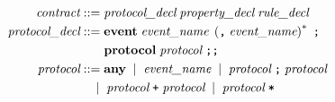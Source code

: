 \documentclass[preview=true]{standalone}
\begin{document}
\begin{table}[t]
\newcommand{\token}[1]{\textbf{#1}}
\newcommand\metasym[1]{{\color{blue}#1}}
\begin{align*}
  \textit{contract} &::=
  \textit{protocol\_decl}\;
   \textit{property\_decl}\;
   \textit{rule\_decl}\;
  \\
  \medskip
  \textit{protocol\_decl} &::=
    \token{event}\;
      \textit{event\_name}\;
      \left(\texttt{,}\; \textit{event\_name}\right)^\ast\; \texttt{;}
  \\&\hspace{1.9em}
  \token{protocol}\;
   \textit{protocol}\; \texttt{;;}
  \\
  \textit{protocol} &::=
  \token{any}\;
  \mid\; \textit{event\_name}\;
  \mid\; \textit{protocol}\; \texttt{;}\; \textit{protocol}\;
  \\&\quad
  \mid\;
  \textit{protocol}\; \texttt{+}\; \textit{protocol}\;
  \mid\;
  \textit{protocol}\; \texttt{*}\;
  \\

\end{align*}
\end{table}
\end{document}
